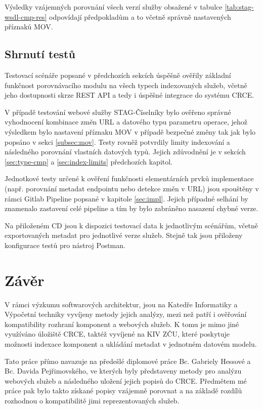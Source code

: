 \documentclass[czech,DP]{thesiskiv}
\begin{document}
Výsledky vzájemných porovnání všech verzí služby obsažené v tabulce \ref{tab:stag-wsdl-cmp-res} odpovídají předpokladům a to včetně správně nastavených příznaků MOV.

\section{Shrnutí testů}

Testovací scénáře popsané v předchozích sekcích úspěšně ověřily základní funkčnost porovnávacího modulu na všech typech indexovaných služeb, včetně jeho dostupnosti skrze REST API a tedy i úspěšné integrace do systému CRCE. 

V případě testování webové služby STAG-Číselníky bylo ověřeno správné vyhodnocení kombinace změn URL a datového typu parametru operace, jehož výsledkem bylo nastavení příznaku MOV v případě bezpečné změny tak jak bylo popsáno v sekci \ref{subsec:mov}. Testy rovněž potvrdily limity indexování a následného porovnání vlastních datových typů. Jejich zdůvodnění je v sekcích \ref{sec:type-cmp} a \ref{sec:index-limits} předchozích kapitol. 

Jednotkové testy určené k ověření funkčnosti elementárních prvků implementace (např. porovnání metadat endpointu nebo detekce změn v URL) jsou spouštěny v rámci Gitlab Pipeline popsané v kapitole \ref{sec:impl}. Jejich případné selhání by znamenalo zastavení celé pipeline a tím by bylo zabráněno nasazení chybné verze.

Na přiloženém CD jsou k dispozici testovací data k jednotlivým scénářům, včetně exportovaných metadat pro jednotlivé verze služeb. Stejně tak jsou přiloženy konfigurace testů pro nástroj Postman.


\chapter{Závěr}	

V rámci výzkumu softwarových architektur, jsou na Katedře Informatiky a Výpočetní techniky vyvíjeny metody jejich analýzy, mezi než patří i ověřování kompatibility rozhraní komponent a webových služeb. K tomu je mimo jiné využíváno úložiště CRCE, taktéž vyvíjené na KIV ZČU, které poskytuje možnosti indexace komponent a ukládání metadat v jednotném datovém modelu. 

Tato práce přímo navazuje na předešlé diplomové práce Bc. Gabriely Hessové a Bc. Davida Pejřimovského, ve kterých byly představeny metody pro analýzu webových služeb a následného uložení jejich popisů do CRCE. Předmětem mé práce pak bylo takto získané popisy vzájemně porovnat a na základě rozdílů rozhodnou o kompatibilitě jimi reprezentovaných služeb.
\end{document}
